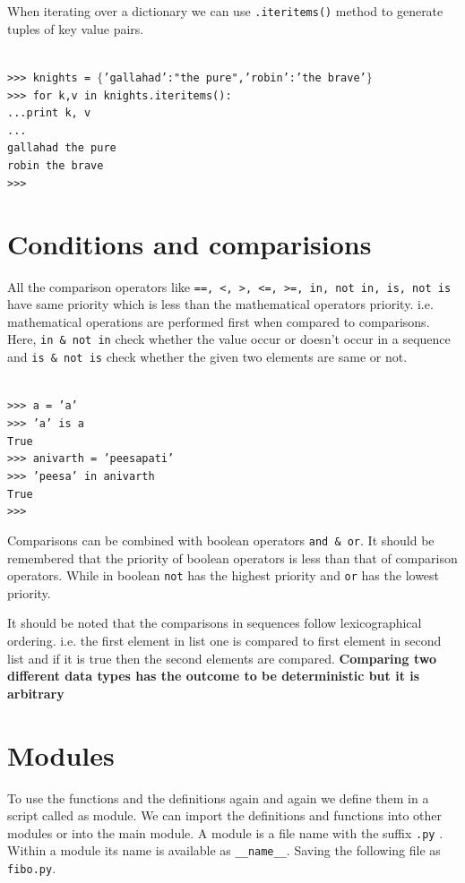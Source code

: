 \documentclass[12pt,a4paper]{article}
\begin{document}
When iterating over a dictionary we can use \texttt{.iteritems()} method to generate tuples of key value pairs.

\texttt{\\
>>> knights = $\lbrace$'gallahad':"the pure",'robin':'the brave'$\rbrace$\\
>>> for k,v in knights.iteritems():\\
...\hspace{30pt}print k, v\\
...\\
gallahad the pure\\
robin the brave\\
>>>
}
\section{Conditions and comparisions}
All the comparison operators like \texttt{==, <, >, <=, >=, in, not in, is, not is} have same priority which is less than the mathematical operators priority. i.e. mathematical operations are performed first when compared to comparisons. Here, \texttt{in \& not in} check whether the value occur or doesn't occur in a sequence and \texttt{is \& not is}  check whether the given two elements are same or not. 

\texttt{\\
>>> a = 'a'\\
>>> 'a' is a\\
True\\
>>> anivarth = 'peesapati'\\
>>> 'peesa' in anivarth\\
True\\
>>>\\}

Comparisons can be combined with boolean operators \texttt{and \& or}. It should be remembered that the priority of boolean operators is less than that of comparison operators. While in boolean \texttt{not} has the highest priority and \texttt{or} has the lowest priority.

It should be noted that the comparisons in sequences follow lexicographical ordering. i.e. the first element in list one is compared to first element in second list and if it is true then the second elements are compared. \textbf{Comparing two different data types has the outcome to be deterministic but it is arbitrary}

\section{Modules}
To use the functions and the definitions again and again we define them in a script called as module. We can import the definitions and functions into other modules or into the main module. A module is a file name with the suffix \texttt{.py} . Within a module its name is available as \texttt{\_\_name\_\_}.  Saving the following file as \texttt{fibo.py}.
\end{document}
